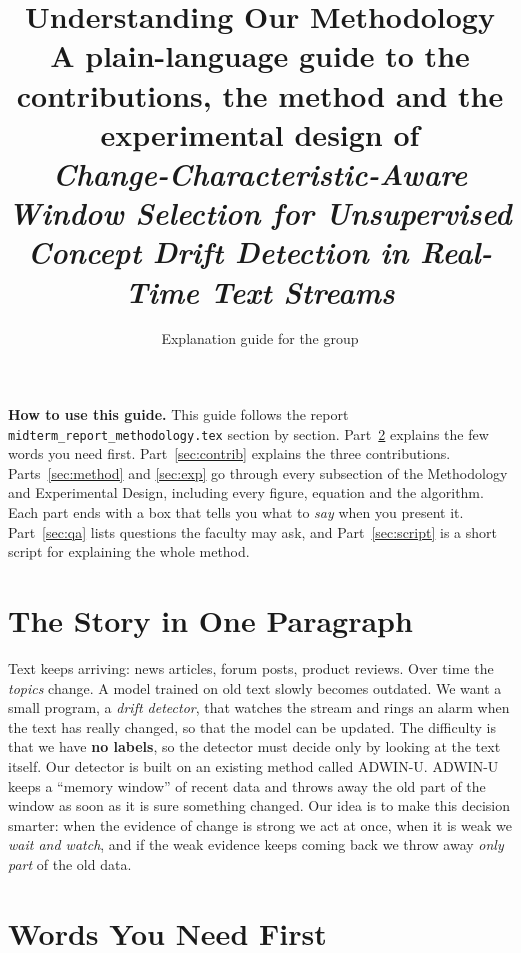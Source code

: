 \documentclass[11pt,a4paper]{article}
\title{\textbf{Understanding Our Methodology}\\[4pt]
\large A plain-language guide to the contributions, the method and the experimental design of\\ \emph{Change-Characteristic-Aware Window Selection for Unsupervised Concept Drift Detection in Real-Time Text Streams}}
\author{Explanation guide for the group}
\date{}
\begin{document}
\maketitle

\begin{keybox}
\textbf{How to use this guide.} This guide follows the report \texttt{midterm\_report\_methodology.tex} section by section. Part~\ref{sec:words} explains the few words you need first. Part~\ref{sec:contrib} explains the three contributions. Parts~\ref{sec:method} and \ref{sec:exp} go through every subsection of the Methodology and Experimental Design, including every figure, equation and the algorithm. Each part ends with a box that tells you what to \emph{say} when you present it. Part~\ref{sec:qa} lists questions the faculty may ask, and Part~\ref{sec:script} is a short script for explaining the whole method.
\end{keybox}

\tableofcontents
\newpage

\section{The Story in One Paragraph}

Text keeps arriving: news articles, forum posts, product reviews. Over time the \emph{topics} change. A model trained on old text slowly becomes outdated. We want a small program, a \emph{drift detector}, that watches the stream and rings an alarm when the text has really changed, so that the model can be updated. The difficulty is that we have \textbf{no labels}, so the detector must decide only by looking at the text itself. Our detector is built on an existing method called ADWIN-U. ADWIN-U keeps a ``memory window'' of recent data and throws away the old part of the window as soon as it is sure something changed. Our idea is to make this decision smarter: when the evidence of change is strong we act at once, when it is weak we \emph{wait and watch}, and if the weak evidence keeps coming back we throw away \emph{only part} of the old data.

\section{Words You Need First}
\label{sec:words}
\end{document}
